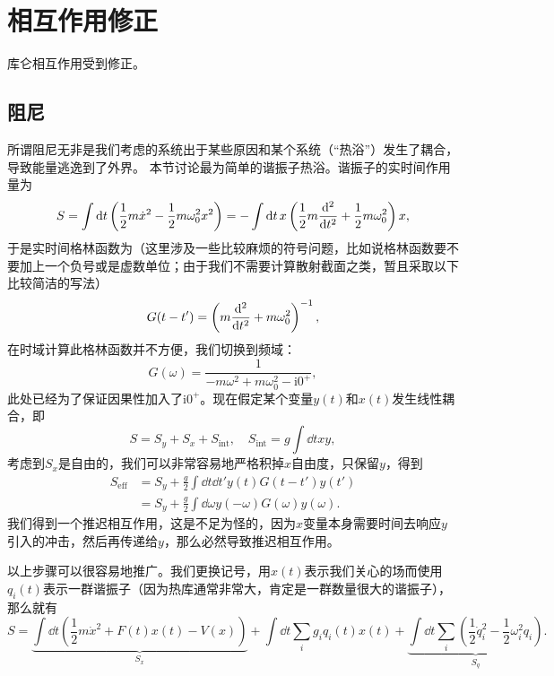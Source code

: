 \documentclass[hyperref, UTF8, a4paper]{ctexart}
\newcommand*{\ii}{\mathrm{i}}
\begin{document}
\section{相互作用修正}

库仑相互作用受到修正。

\subsection{阻尼}

所谓阻尼无非是我们考虑的系统出于某些原因和某个系统（“热浴”）发生了耦合，导致能量逃逸到了外界。
本节讨论最为简单的谐振子热浴。谐振子的实时间作用量为
\begin{equation}
    S = \int \dd{t} \left( \frac{1}{2} m \dot{x}^2 - \frac{1}{2} m \omega_0^2 x^2 \right) = - \int \dd{t} x \left( \frac{1}{2} m \dv[2]{t} + \frac{1}{2} m \omega_0^2 \right) x,
\end{equation}
于是实时间格林函数为（这里涉及一些比较麻烦的符号问题，比如说格林函数要不要加上一个负号或是虚数单位；由于我们不需要计算散射截面之类，暂且采取以下比较简洁的写法）
\begin{equation}
    G(t-t') = \left( m \dv[2]{t} + m \omega_0^2 \right)^{-1},
\end{equation}
在时域计算此格林函数并不方便，我们切换到频域：
\begin{equation}
    G(\omega) = \frac{1}{- m \omega^2 + m \omega_0^2 - \ii 0^+},
\end{equation}
此处已经为了保证因果性加入了$\ii 0^+$。现在假定某个变量$y(t)$和$x(t)$发生线性耦合，即
\begin{equation}
    S = S_y + S_x + S_\text{int}, \quad S_\text{int} = g \int \dd{t} xy,
\end{equation}
考虑到$S_x$是自由的，我们可以非常容易地严格积掉$x$自由度，只保留$y$，得到
\begin{equation}
    \begin{aligned}
        S_\text{eff} &= S_y + \frac{g}{2} \int \dd{t} \dd{t'} y(t) G(t-t') y(t') \\
        &= S_y + \frac{g}{2} \int \dd{\omega} y(-\omega) G(\omega) y(\omega).
    \end{aligned}
\end{equation}
我们得到一个推迟相互作用，这是不足为怪的，因为$x$变量本身需要时间去响应$y$引入的冲击，然后再传递给$y$，那么必然导致推迟相互作用。

以上步骤可以很容易地推广。我们更换记号，用$x(t)$表示我们关心的场而使用$q_i(t)$表示一群谐振子（因为热库通常非常大，肯定是一群数量很大的谐振子），那么就有
\begin{equation}
    S = \underbrace{\int \dd{t} \left( \frac{1}{2} m \dot{x}^2 + F(t) x(t) - V(x) \right)}_{S_x} + \int \dd{t} \sum_i g_i q_i(t) x(t) + \underbrace{\int \dd{t} \sum_i \left( \frac{1}{2} \dot{q}_i^2 - \frac{1}{2} \omega_i^2 q_i \right)}_{S_q}.
\end{equation}
\end{document}
